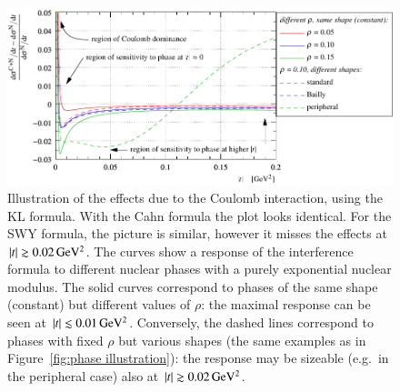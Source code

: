 \begin{figure}
\begin{center}
\includegraphics{fig/cni_effect_illustration.pdf}
\caption{%
Illustration of the effects due to the Coulomb interaction, using the KL formula. With the Cahn formula the plot looks identical. For the SWY formula, the picture is similar, however it misses the effects at $|t| \gtrsim 0.02\,{\rm GeV^2}$. The curves show a response of the interference formula to different nuclear phases with a purely exponential nuclear modulus. The solid curves correspond to phases of the same shape (constant) but different values of $\rho$: the maximal response can be seen at $|t| \lesssim 0.01\,{\rm GeV^2}$. Conversely, the dashed lines correspond to phases with fixed $\rho$ but various shapes (the same examples as in Figure~\ref{fig:phase illustration}): the response may be sizeable (e.g.~in the peripheral case) also at $|t| \gtrsim 0.02\,{\rm GeV^2}$.
}
\label{fig:cni effect}
\end{center}
\end{figure}

